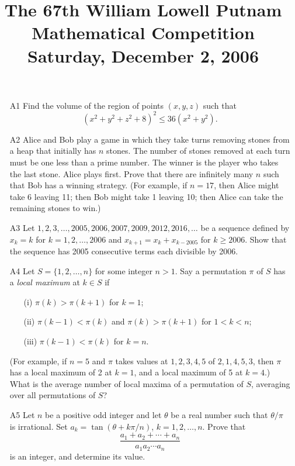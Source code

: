 \documentclass[amssymb,twocolumn,pra,10pt,aps]{revtex4-1}
\begin{document}
\title{The 67th William Lowell Putnam Mathematical Competition \\
    Saturday, December 2, 2006}
\maketitle

\begin{itemize}

\item[A1]
Find the volume of the region of points $(x,y,z)$ such that
\[
(x^2 + y^2 + z^2 + 8)^2 \leq 36(x^2 + y^2).
\]

\item[A2]
Alice and Bob play a game in which they take turns removing stones from
a heap that initially has $n$ stones. The number of stones removed at
each turn must be one less than a prime number. The winner is the player
who takes the last stone. Alice plays first. Prove that there are
infinitely many $n$ such that Bob has a winning strategy.
(For example, if $n=17$, then Alice might take 6 leaving 11; then
Bob might take 1 leaving 10; then Alice can take the remaining stones
to win.)

\item[A3]
Let $1, 2, 3, \dots, 2005, 2006, 2007, 2009, 2012, 2016, \dots$
be a sequence defined by $x_k = k$ for $k=1, 2, \dots, 2006$ and
$x_{k+1} = x_k + x_{k-2005}$ for $k \geq 2006$. Show that the sequence has
2005 consecutive terms each divisible by 2006.

\item[A4]
Let $S = \{1, 2, \dots, n\}$ for some integer $n > 1$. Say a permutation
$\pi$ of $S$ has a \emph{local maximum} at $k \in S$ if
\begin{enumerate} %
\item[(i)]
$\pi(k) > \pi(k+1)$ for $k=1$;
\item[(ii)]
$\pi(k-1) < \pi(k)$ and $\pi(k) > \pi(k+1)$ for $1 < k < n$;
\item[(iii)]
$\pi(k-1) < \pi(k)$ for $k=n$.
\end{enumerate}
(For example, if $n=5$ and $\pi$ takes values at $1, 2, 3, 4, 5$ of
$2, 1, 4, 5, 3$, then $\pi$ has a local maximum of 2 at $k=1$,
and a local maximum of 5 at $k=4$.)
What is the average number of local maxima of a permutation of $S$,
averaging over all permutations of $S$?

\item[A5]
Let $n$ be a positive odd integer and let $\theta$ be a real number such
that $\theta/\pi$ is irrational. Set $a_k = \tan (\theta + k \pi/n)$,
$k=1,2,\dots,n$. Prove that
\[
\frac{a_1 + a_2 + \cdots + a_n}{a_1 a_2 \cdots a_n}
\]
is an integer, and determine its value.


\end{itemize}
\end{document}
